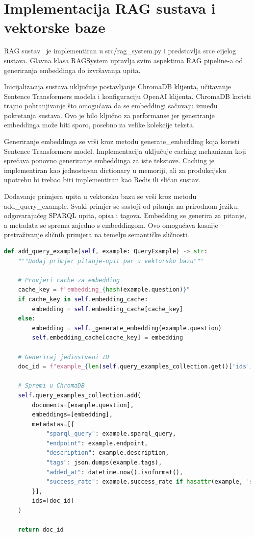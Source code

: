 \section{Implementacija RAG sustava i vektorske baze}

RAG sustav~\cite{lewis2020retrieval} je implementiran u src/rag\_system.py i predstavlja srce cijelog sustava. Glavna klasa RAGSystem upravlja svim aspektima RAG pipeline-a od generiranja embeddinga do izvršavanja upita.

Inicijalizacija sustava uključuje postavljanje ChromaDB klijenta, učitavanje Sentence Transformers modela i konfiguraciju OpenAI klijenta. ChromaDB koristi trajno pohranjivanje što omogućava da se embeddingi sačuvaju između pokretanja sustava. Ovo je bilo ključno za performanse jer generiranje embeddinga može biti sporo, posebno za velike kolekcije teksta.

Generiranje embeddinga se vrši kroz metodu generate\_embedding koja koristi Sentence Transformers model. Implementacija uključuje caching mehanizam koji sprečava ponovno generiranje embeddinga za iste tekstove. Caching je implementiran kao jednostavan dictionary u memoriji, ali za produkcijsku upotrebu bi trebao biti implementiran kao Redis ili sličan sustav.

Dodavanje primjera upita u vektorsku bazu se vrši kroz metodu add\_query\_example. Svaki primjer se sastoji od pitanja na prirodnom jeziku, odgovarajućeg SPARQL upita, opisa i tagova. Embedding se generira za pitanje, a metadata se sprema zajedno s embeddingom. Ovo omogućava kasnije pretraživanje sličnih primjera na temelju semantičke sličnosti.

\begin{lstlisting}[language=Python, caption=Implementacija dodavanja primjera u vektorsku bazu]
def add_query_example(self, example: QueryExample) -> str:
    """Dodaj primjer pitanje-upit par u vektorsku bazu"""
    
    # Provjeri cache za embedding
    cache_key = f"embedding_{hash(example.question)}"
    if cache_key in self.embedding_cache:
        embedding = self.embedding_cache[cache_key]
    else:
        embedding = self._generate_embedding(example.question)
        self.embedding_cache[cache_key] = embedding
    
    # Generiraj jedinstveni ID
    doc_id = f"example_{len(self.query_examples_collection.get()['ids'])}"
    
    # Spremi u ChromaDB
    self.query_examples_collection.add(
        documents=[example.question],
        embeddings=[embedding],
        metadatas=[{
            "sparql_query": example.sparql_query,
            "endpoint": example.endpoint,
            "description": example.description,
            "tags": json.dumps(example.tags),
            "added_at": datetime.now().isoformat(),
            "success_rate": example.success_rate if hasattr(example, 'success_rate') else None
        }],
        ids=[doc_id]
    )
    
    return doc_id
\end{lstlisting}

